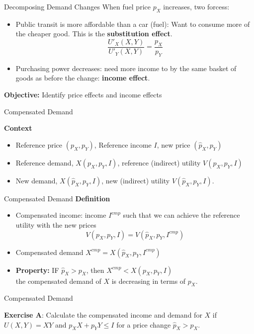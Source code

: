 \documentclass[handout]{beamer}
\newenvironment{iPar}[1]{\textbf{#1} \begin{itemize}}{\end{itemize}}
\newcommand{\cp}{{cmp}}
\begin{document}
\begin{frame}{Decomposing Demand Changes}
When fuel price $p_X$ increases, two forcess: \begin{itemize}
\item Public transit is more affordable than a car (fuel): Want to consume more of the cheaper good. This is the \textbf{substitution effect}. $$ \frac{U'_X(X,Y)}{U'_Y(X,Y)} = \frac{p_X}{p_Y}$$

\item Purchasing power decreases: need more income to by the same basket of goods as before the change: \textbf{income effect}.
\end{itemize}

\textbf{Objective:} Identify price effects and income effects

\end{frame}

\begin{frame}{Compensated Demand}

\begin{iPar}{Context}
\item Reference price $(p_X,p_Y)$, Reference income $I$, new price $(\hat p_X,p_Y)$
\item Reference demand, $X(p_X,p_Y,I)$, reference (indirect) utility $V(p_X,p_Y,I)$
\item New demand, $X(\hat p_X, p_Y, I)$, new (indirect) utility $V(\hat p_X,p_Y,I)$.
\end{iPar}
\end{frame}

\begin{frame}{Compensated Demand}
\begin{iPar}{Definition}
\item Compensated income: income $I^\cp$ such that we can achieve the reference utility with the new prices $$V(p_X,p_Y, I) = V(\hat p_X, p_Y,  I^\cp)$$
\item Compensated demand $X^\cp = X(\hat p_X, p_Y,  I^\cp)$
\item \textbf{Property:}  IF $\hat p_X > p_X$, then $X^\cp <X(p_X,p_Y,I)$\\ the compensated demand of $X$ is decreasing in terms of $p_X$.
\end{iPar}
\end{frame}

\begin{frame}{Compensated Demand}

\textbf{Exercise A}: Calculate the compensated income and demand for $X$ if $U(X,Y) = XY$ and $p_XX+p_YY \le I$ for a price change $\hat p_X > p_X$. 

\end{frame}
\end{document}
